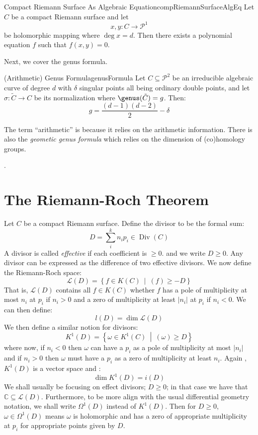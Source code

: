 \documentclass{book}
\newcommand{\C}{{\mathbb{C}}}
\newcommand{\CL}{{\mathcal{L}}}
\newcommand{\CP}{{\mathcal{P}}}
\newcommand{\Div}{{\operatorname{Div}}}
\newcommand{\sse}{\subseteq}
\newcommand{\set}[2]{\left\{#1 \ \middle|\ #2\right\}}
\begin{document}
\begin{cor}{Compact Riemann Surface As Algebraic Equation}{compRiemannSurfaceAlgEq}
  Let $C$ be a compact Riemann surface and let
  \[
    x,y: C \to \CP^1
  \]
  be holomorphic mapping where $\deg x = d$. Then there exists a polynomial equation $f$ such that $f(x,y) =
  0$.
\end{cor}

\begin{Proof}
  \cite[p.94]{a.griffithsIntroductionAlgebraicCurves}
\end{Proof}

Next, we cover the genus formula.

\begin{thm}{(Arithmetic) Genus Formula}{genusFormula}
  Let $C \sse \CP^2$ be an irreducible algebraic curve of degree $d$ with $\delta$ singular points all being
  ordinary double points, and let $\sigma: \tilde{C} \to C$ be its normalization where $\genus (\tilde{C})
  = g$. Then:
  \[
    g = \frac{(d-1)(d-2)}{2} - \delta
  \]
\end{thm}
The term ``arithmetic'' is because it relies on the arithmetic information. There is also the \emph{geometic
genus formula} which relies on the dimension of (co)homology groups.




\begin{Proof}
  \cite[p.95]{a.griffithsIntroductionAlgebraicCurves}.
\end{Proof}

\section{The Riemann-Roch Theorem}\label{sec:RiemannRochThm}

Let $C$ be a compact Riemann surface. Define the divisor to be the formal sum:
\[
  D = \sum_i^k n_ip_i \in \Div(C)
\]
A divisor is called \emph{effective} if each coefficient  is $\ge 0$. and we write $D\ge 0$. Any divisor can
be expressed as the difference of two effective divisors. We now define the Riemann-Roch space:
\[
  \CL(D) = \set{f \in K(C)}{(f)  \ge -D}
\]
That is, $\CL(D)$ contains all $f \in K(C)$ whether $f$ has a pole of multiplicity at most $n_i$ at $p_i$ if
$n_i >0$ and a zero of multiplicity at least $|n_i|$ at $p_i$ if $n_i < 0$. We can then define:
\[
  l(D) = \dim \CL(D)
\]
We then define a similar notion for divisors:
\[
  K^1(D) = \set{\omega \in K^1(C)}{(\omega) \ge D}
\]
where now, if $n_i < 0$ then $\omega$ can have a $p_i$ as a pole of multiplicity at most $|n_i|$ and if $n_i
> 0$ then $\omega$ must have a $p_i$ as a zero of multiplicity at least $n_i$. Again , $K^1(D)$ is a vector
space and :
\[
  \dim K^1(D) = i(D)
\]
We shall usually be focusing on effect divisors; $D \ge 0$; in that case we have that $\C \sse \CL(D)$.
Furthermore, to be more align with the usual differential geometry notation, we shall write $\Omega^1(D)$
instead of $K^1(D)$. Then for $D \ge 0$, $\omega \in \Omega^1(D)$ means $\omega$ is holomorphic and has a zero
of appropriate multiplicity at $p_i$ for appropriate points given by $D$.
\end{document}
